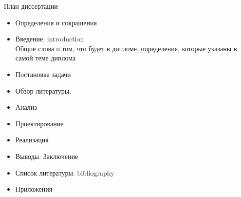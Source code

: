 \documentclass[11pt]{article}
\begin{document}
\Large{План диссертации}

\begin{itemize}
\item Определения и сокращения
\item Введение. introduction\\
Общие слова о том, что будет в дипломе, определения, которые указаны в самой теме диплома
\item Постановка задачи
\item Обзор литературы.
\item Анализ
\item Проектирование
\item Реализация
\item Выводы. Заключение
\item Список литературы. bibliography
\item Приложения
\end{itemize}
\newpage
\end{document}
